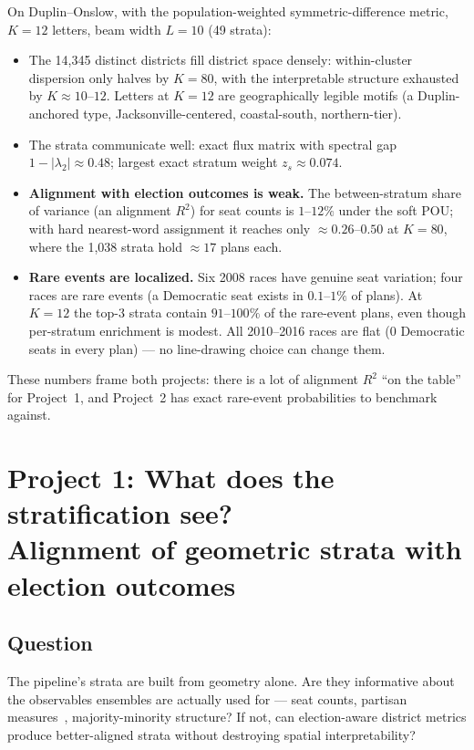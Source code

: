 \documentclass[11pt]{article}
\begin{document}
On Duplin--Onslow, with the population-weighted symmetric-difference
metric, $K=12$ letters, beam width $L=10$ (49 strata):

\begin{itemize}[itemsep=2pt]
  \item The 14{,}345 distinct districts fill district space densely:
    within-cluster dispersion only halves by $K=80$, with the
    interpretable structure exhausted by $K\approx 10$--$12$. Letters
    at $K=12$ are geographically legible motifs (a Duplin-anchored
    type, Jacksonville-centered, coastal-south, northern-tier).
  \item The strata communicate well: exact flux matrix with spectral
    gap $1-|\lambda_2| \approx 0.48$; largest exact stratum weight
    $z_s \approx 0.074$.
  \item \textbf{Alignment with election outcomes is weak.} The
    between-stratum share of variance (an alignment $R^2$) for seat
    counts is $1$--$12\%$ under the soft POU; with hard nearest-word
    assignment it reaches only $\approx 0.26$--$0.50$ at $K=80$, where
    the 1{,}038 strata hold $\approx 17$ plans each.
  \item \textbf{Rare events are localized.} Six 2008 races have
    genuine seat variation; four races are rare events (a Democratic
    seat exists in $0.1$--$1\%$ of plans). At $K=12$ the top-3 strata
    contain $91$--$100\%$ of the rare-event plans, even though
    per-stratum enrichment is modest. All 2010--2016 races are flat
    (0 Democratic seats in every plan) --- no line-drawing choice can
    change them.
\end{itemize}

These numbers frame both projects: there is a lot of alignment $R^2$
``on the table'' for Project~1, and Project~2 has exact rare-event
probabilities to benchmark against.

\section{Project 1: What does the stratification see?\\
\normalsize Alignment of geometric strata with election outcomes}

\subsection*{Question}

The pipeline's strata are built from geometry alone. Are they
informative about the observables ensembles are actually used for ---
seat counts, partisan measures~\cite{stephanopoulos2015,katz2020},
majority-minority structure? If not, can election-aware district
metrics produce better-aligned strata without destroying spatial
interpretability?
\end{document}
